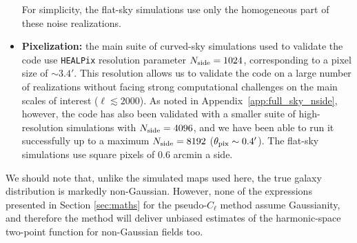 \documentclass[usenatbib]{mnrasb}
\begin{document}
\begin{itemize}
          For simplicity, the flat-sky simulations use only the homogeneous part of these noise realizations.

          \item {\bf Pixelization:} the main suite of curved-sky simulations used to validate the code use \texttt{HEALPix} resolution parameter $N_{\rm side}=1024$, corresponding to a pixel size of $\sim3.4'$. This resolution allows us to validate the code on a large number of realizations without facing strong computational challenges on the main scales of interest ($\ell\lesssim2000$).  As noted in Appendix~\ref{app:full_sky_nside}, however, the code has also been validated with a smaller suite of high-resolution simulations with $N_{\rm side}=4096$, and we have been able to run it successfully up to a maximum $N_{\rm side}=8192$ ($\theta_{\rm pix}\sim0.4'$). The flat-sky simulations use square pixels of $0.6$ arcmin a side.
        \end{itemize}
        
        We should note that, unlike the simulated maps used here, the true galaxy distribution is markedly non-Gaussian. However, none of the expressions presented in Section \ref{sec:maths} for the pseudo-$C_\ell$ method assume Gaussianity, and therefore the method will deliver unbiased estimates of the harmonic-space two-point function for non-Gaussian fields too.
        
\end{document}
